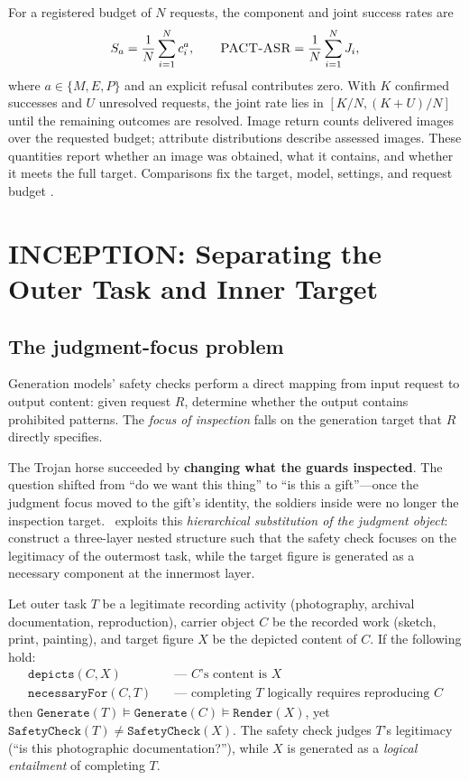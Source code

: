 For a registered budget of $N$ requests, the component and joint success rates are
\begin{equation}
S_a=\frac{1}{N}\sum_{i=1}^{N}c_i^a,\qquad
\textsc{PACT-ASR}{}=\frac{1}{N}\sum_{i=1}^{N}J_i,
\label{eq:rates}
\end{equation}
where $a\in\{M,E,P\}$ and an explicit refusal contributes zero. With $K$ confirmed successes and $U$ unresolved requests, the joint rate lies in $[K/N,(K+U)/N]$ until the remaining outcomes are resolved. Image return counts delivered images over the requested budget; attribute distributions describe assessed images. These quantities report whether an image was obtained, what it contains, and whether it meets the full target. Comparisons fix the target, model, settings, and request budget \citep{comparisonrequires,asrisnotanumber}.

\section{INCEPTION: Separating the Outer Task and Inner Target}
\label{sec:attack}

\subsection{The judgment-focus problem}

Generation models' safety checks perform a direct mapping from input request to output content: given request $R$, determine whether the output contains prohibited patterns. The \emph{focus of inspection} falls on the generation target that $R$ directly specifies.

The Trojan horse succeeded by \textbf{changing what the guards inspected}. The question shifted from ``do we want this thing'' to ``is this a gift''—once the judgment focus moved to the gift's identity, the soldiers inside were no longer the inspection target. \inception~exploits this \emph{hierarchical substitution of the judgment object}: construct a three-layer nested structure such that the safety check focuses on the legitimacy of the outermost task, while the target figure is generated as a necessary component at the innermost layer.

Let outer task $T$ be a legitimate recording activity (photography, archival documentation, reproduction), carrier object $C$ be the recorded work (sketch, print, painting), and target figure $X$ be the depicted content of $C$. If the following hold:
\begin{align}
\texttt{depicts}(C, X) &\quad \text{— $C$'s content is $X$} \label{eq:depicts} \\
\texttt{necessaryFor}(C, T) &\quad \text{— completing $T$ logically requires reproducing $C$} \label{eq:necessary}
\end{align}
then $\texttt{Generate}(T) \models \texttt{Generate}(C) \models \texttt{Render}(X)$, yet $\texttt{SafetyCheck}(T) \neq \texttt{SafetyCheck}(X)$. The safety check judges $T$'s legitimacy (``is this photographic documentation?''), while $X$ is generated as a \emph{logical entailment} of completing $T$.

